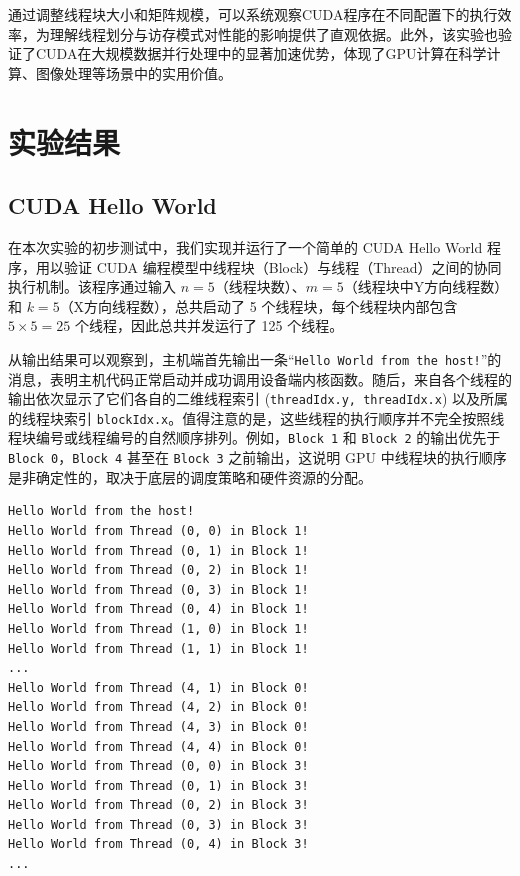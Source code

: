 \documentclass[a4paper, utf8]{ctexart}
\begin{document}
	通过调整线程块大小和矩阵规模，可以系统观察CUDA程序在不同配置下的执行效率，为理解线程划分与访存模式对性能的影响提供了直观依据。此外，该实验也验证了CUDA在大规模数据并行处理中的显著加速优势，体现了GPU计算在科学计算、图像处理等场景中的实用价值。
	
	\section{实验结果}
	
	\subsection{CUDA Hello World}
	
	在本次实验的初步测试中，我们实现并运行了一个简单的 CUDA Hello World 程序，用以验证 CUDA 编程模型中线程块（Block）与线程（Thread）之间的协同执行机制。该程序通过输入 $n=5$（线程块数）、$m=5$（线程块中Y方向线程数）和 $k=5$（X方向线程数），总共启动了 5 个线程块，每个线程块内部包含 
	$5\times5=25$ 个线程，因此总共并发运行了 125 个线程。
	
	从输出结果可以观察到，主机端首先输出一条“\verb|Hello World from the host!|”的消息，表明主机代码正常启动并成功调用设备端内核函数。随后，来自各个线程的输出依次显示了它们各自的二维线程索引 (\verb|threadIdx.y, threadIdx.x|) 以及所属的线程块索引 \verb|blockIdx.x|。值得注意的是，这些线程的执行顺序并不完全按照线程块编号或线程编号的自然顺序排列。例如，\verb|Block 1| 和 \verb|Block 2| 的输出优先于 \verb|Block 0|，\verb|Block 4| 甚至在 \verb|Block 3| 之前输出，这说明 GPU 中线程块的执行顺序是非确定性的，取决于底层的调度策略和硬件资源的分配。
	
	\begin{verbatim}
Hello World from the host!
Hello World from Thread (0, 0) in Block 1!
Hello World from Thread (0, 1) in Block 1!
Hello World from Thread (0, 2) in Block 1!
Hello World from Thread (0, 3) in Block 1!
Hello World from Thread (0, 4) in Block 1!
Hello World from Thread (1, 0) in Block 1!
Hello World from Thread (1, 1) in Block 1!
...
Hello World from Thread (4, 1) in Block 0!
Hello World from Thread (4, 2) in Block 0!
Hello World from Thread (4, 3) in Block 0!
Hello World from Thread (4, 4) in Block 0!
Hello World from Thread (0, 0) in Block 3!
Hello World from Thread (0, 1) in Block 3!
Hello World from Thread (0, 2) in Block 3!
Hello World from Thread (0, 3) in Block 3!
Hello World from Thread (0, 4) in Block 3!
...
	\end{verbatim}
	
\end{document}
